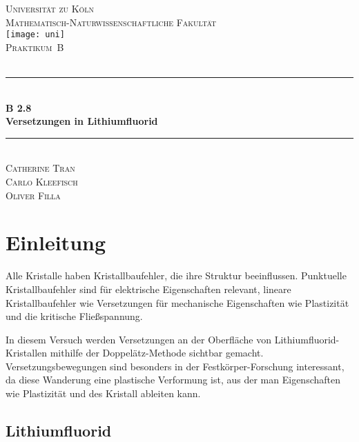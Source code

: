 \documentclass[12pt,a4paper]{scrartcl}
\numberwithin{equation}{section} %
\newcommand{\HRule}{\rule{\linewidth}{0.7mm}}
\renewcommand{\[}{} %
\renewcommand{\]}{\noindent} %
\begin{document}
\begin{titlepage}
	\pagestyle{empty}

	\begin{center}

	\textsc{\LARGE Universität zu Köln }\\ [0.4cm]
	\textsc{Mathematisch-Naturwissenschaftliche Fakultät} \\[1.5cm]

	\texttt{[image: uni]}\\[1.5cm]  %

	\textsc{\Large Praktikum~B}\\[2mm]
	\textsc{}\\[10mm]
	\HRule \\[0.4cm]

		{	\Huge \bfseries B 2.8}\\[0.4cm]
			{	\huge \bfseries Versetzungen in Lithiumfluorid}\\[0.3cm]
	
	\HRule \\[3cm]

		\textsc{\Large Catherine Tran } \\[3pt]
		\textsc{\Large Carlo Kleefisch } \\[3pt]
		\textsc{\Large Oliver Filla } \\[3pt]
	\end{center}
\end{titlepage}

\newpage
\tableofcontents
\newpage

\hypertarget{einleitung}{%
\section{Einleitung}\label{einleitung}}

Alle Kristalle haben Kristallbaufehler, die ihre Struktur beeinflussen.
Punktuelle Kristallbaufehler sind für elektrische Eigenschaften
relevant, lineare Kristallbaufehler wie Versetzungen für mechanische
Eigenschaften wie Plastizität und die kritische Fließspannung.

In diesem Versuch werden Versetzungen an der Oberfläche von
Lithiumfluorid-Kristallen mithilfe der Doppelätz-Methode sichtbar
gemacht. Versetzungsbewegungen sind besonders in der
Festkörper-Forschung interessant, da diese Wanderung eine plastische
Verformung ist, aus der man Eigenschaften wie Plastizität und des
Kristall ableiten kann.

\hypertarget{lithiumfluorid}{%
\subsection{Lithiumfluorid}\label{lithiumfluorid}}
\end{document}

